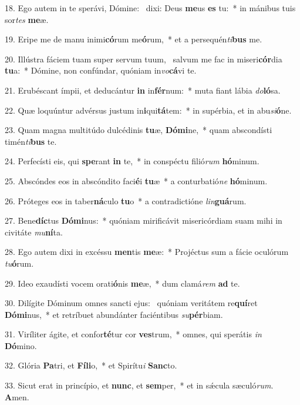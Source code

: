 18. Ego autem in te sperávi, Dómine: \dag\  dixi: Deus \textbf{me}us \textbf{es} tu:~*  in mánibus tuis sor\textit{tes} \textbf{me}æ.\

19. Eripe me de manu inimi\textbf{có}rum me\textbf{ó}rum,~*  et a persequén\textit{ti}\textbf{bus} me.\

20. Illústra fáciem tuam super servum tuum, \dag\  salvum me fac in miseri\textbf{cór}dia \textbf{tu}a:~*  Dómine, non confúndar, quóniam in\textit{vo}\textbf{cá}vi te.\

21. Erubéscant ímpii, et deducántur \textbf{in} in\textbf{fér}num:~*  muta fiant lábia \textit{do}\textbf{ló}sa.\

22. Quæ loquúntur advérsus justum in\textbf{i}qui\textbf{tá}tem:~*  in supérbia, et in abu\textit{si}\textbf{ó}ne.\

23. Quam magna multitúdo dulcédinis \textbf{tu}æ, \textbf{Dó}\textbf{mi}ne,~*  quam abscondísti timén\textit{ti}\textbf{bus} te.\

24. Perfecísti eis, qui \textbf{spe}rant \textbf{in} te,~*  in conspéctu filió\textit{rum} \textbf{hó}minum.\

25. Abscóndes eos in abscóndito faci\textbf{é}i \textbf{tu}æ~*  a conturbatió\textit{ne} \textbf{hó}minum.\

26. Próteges eos in taber\textbf{ná}culo \textbf{tu}o~*  a contradictióne \textit{lin}\textbf{guá}rum.\

27. Bene\textbf{díc}tus \textbf{Dó}\textbf{mi}nus:~*  quóniam mirificávit misericórdiam suam mihi in civitáte \textit{mu}\textbf{ní}ta.\

28. Ego autem dixi in excéssu \textbf{men}tis \textbf{me}æ:~*  Projéctus sum a fácie oculórum \textit{tu}\textbf{ó}rum.\

29. Ideo exaudísti vocem orati\textbf{ó}nis \textbf{me}æ,~*  dum clamá\textit{rem} \textbf{ad} te.\

30. Dilígite Dóminum omnes sancti ejus: \dag\  quóniam veritátem re\textbf{quí}ret \textbf{Dó}\textbf{mi}nus,~*  et retríbuet abundánter faciéntibus \textit{su}\textbf{pér}biam.\

31. Viríliter ágite, et confor\textbf{té}tur cor \textbf{ves}trum,~*  omnes, qui sperátis \textit{in} \textbf{Dó}mino.\

32. Glória \textbf{Pa}tri, et \textbf{Fí}\textbf{li}o,~*  et Spirítu\textit{i} \textbf{Sanc}to.\

33. Sicut erat in princípio, et \textbf{nunc}, et \textbf{sem}per,~*  et in sǽcula sæculó\textit{rum}. \textbf{A}men.\

